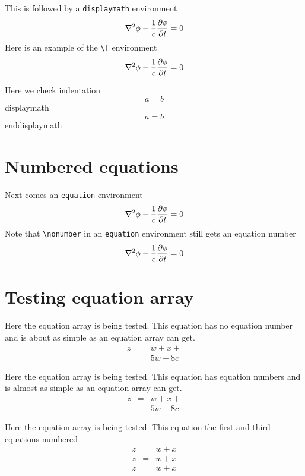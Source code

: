 ﻿\documentclass{article}
\begin{document}
This is followed by a \verb#displaymath# environment
\begin{displaymath}
\nabla^2 \phi -{1\over c} {\partial \phi\over \partial t}  = 0
\end{displaymath}
Here is an example of the \verb#\[# environment
\[
\nabla^2 \phi -{1\over c} {\partial \phi\over \partial t}  = 0
\]

\noindent 
Here we check indentation
\[ 
a=b 
\] 
displaymath 
\begin{displaymath} 
a=b 
\end{displaymath} 
enddisplaymath 


\section{Numbered equations}
Next comes an \verb#equation# environment
\begin{equation}
\nabla^2 \phi -{1\over c} {\partial \phi\over \partial t}  = 0
\end{equation}
Note that \verb#\nonumber# in an \verb#equation# environment still gets
an equation number
\begin{equation}
\nabla^2 \phi -{1\over c} {\partial \phi\over \partial t}  = 0 \nonumber
\end{equation}

\section{Testing equation array}

Here the equation array is being tested.  This equation has no equation number
and is about as simple as an equation array can get.
\begin{eqnarray*}
z & = & w + x + \\
  &   & 5w - 8c 
\end{eqnarray*}

Here the equation array is being tested.  This equation has equation numbers
and is almost as simple as an equation array can get.
\begin{eqnarray}
z & = & w + x + \\
  &   & 5w - 8c 
\end{eqnarray}

Here the equation array is being tested.  This equation the first and third equations numbered
\begin{eqnarray}
z & = & w + x  \\
z & = & w + x \nonumber\\
z & = & w + x  
\end{eqnarray}
\end{document}
